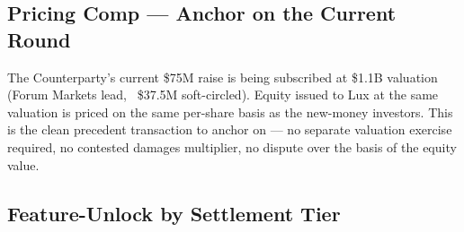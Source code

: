 \documentclass[11pt,letterpaper]{article}
\begin{document}
\subsection*{Pricing Comp --- Anchor on the Current Round}

The Counterparty's current \$75M raise is being subscribed at \$1.1B
valuation (Forum Markets lead, ~\$37.5M soft-circled). Equity issued
to Lux at the same valuation is priced on the same per-share basis
as the new-money investors. This is the clean precedent transaction
to anchor on --- no separate valuation exercise required, no
contested damages multiplier, no dispute over the basis of the
equity value.

\subsection*{Feature-Unlock by Settlement Tier}
\end{document}
